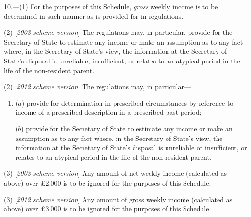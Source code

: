 \documentclass[12pt,a4paper]{article}
\begin{document}
10.---(1) For the purposes of this Schedule, 
\emph{gross}  %
weekly income is to be determined in such manner as is provided for in regulations.

(2) [\emph{2003 scheme version}] The regulations may, in particular, provide for the 
Secretary of State  %
to estimate any income or make an assumption as to any fact where, in 
the Secretary of State's %
view, the information at 
the Secretary of State's  %
disposal is unreliable, insufficient, or relates to an atypical period in the life of the non-resident parent.

(2) [\emph{2012 scheme version}] The regulations may, in particular—
\begin{enumerate}\item[]
($a$) provide for determination in prescribed circumstances by reference to income of a prescribed description in a prescribed past period;

($b$) provide for the Secretary of State to estimate any income or make an assumption as to any fact where, in the Secretary of State's view, the information at the Secretary of State's disposal is unreliable or insufficient, or relates to an atypical period in the life of the non-resident parent.
\end{enumerate}

(3) [\emph{2003 scheme version}] Any amount of net weekly income (calculated as above) over £2,000 is to be ignored for the purposes of this Schedule.

(3) [\emph{2012 scheme version}] Any amount of 
gross  %
weekly income (calculated as above) over £3,000 is to be ignored for the purposes of this Schedule.

\end{document}
